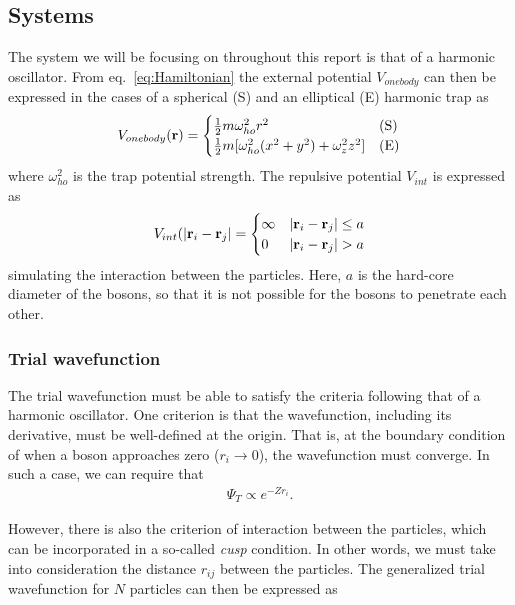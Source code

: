 \documentclass[
    a4paper, aps, twocolumn, floatfix, superscriptaddress,
    nofootinbib]{revtex4-1}
\begin{document}
\subsection{Systems}
The system we will be focusing on throughout this report is that of a harmonic oscillator. From eq.~\eqref{eq:Hamiltonian} the external potential $V_{onebody}$ can then be expressed in the cases of a spherical (S) and an elliptical (E) harmonic trap as
\begin{align}
V_{onebody}(\bold{r}) = \begin{cases}
      \frac{1}{2}m\omega_{ho}^2r^2 & \text{(S)}\\
      \frac{1}{2}m[\omega_{ho}^2(x^2 + y^2) + \omega_z^2 z^2] & \text{(E)}
    \end{cases} \label{eq:V_ext}
\end{align}
where $\omega_{ho}^2$ is the trap potential strength. The repulsive potential $V_{int}$ is expressed as
\begin{align}
    V_{int}(|\bold{r}_i - \bold{r}_j| = \begin{cases}
    \infty &|\bold{r}_i - \bold r_j| \leq a \\
    0 & |\bold r_i - \bold r_j| > a
    \end{cases} \label{eq:V_int}
\end{align}
simulating the interaction between the particles. Here, $a$ is the hard-core diameter of the bosons, so that it is not possible for the bosons to penetrate each other.
\subsubsection{Trial wavefunction} The trial wavefunction must be able to satisfy the criteria following that of a harmonic oscillator. One criterion is that the wavefunction, including its derivative, must be well-defined at the origin. That is, at the boundary condition of when a boson approaches zero ($r_{i}\rightarrow 0$), the wavefunction must converge. In such a case, we can require that
\begin{align}
    \Psi_T \propto e^{-Zr_i}. \label{eq:psi_T_boundary_condition}
\end{align}

However, there is also the criterion of interaction between the particles, which can be incorporated in a so-called \textit{cusp} condition. In other words, we must take into consideration the distance $r_{ij}$ between the particles. The generalized trial wavefunction for $N$ particles can then be expressed as
\end{document}
